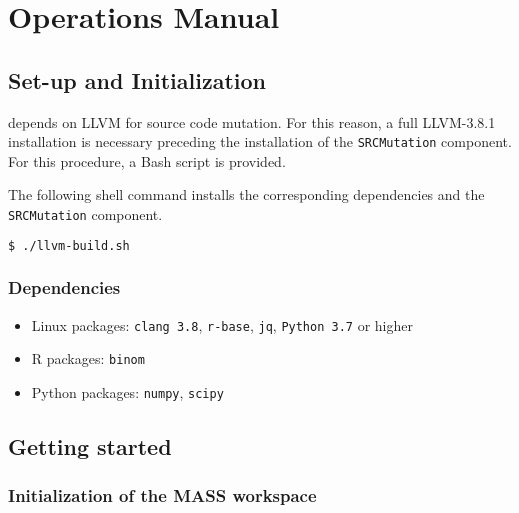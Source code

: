 
\chapter{Operations Manual}

\section{Set-up and Initialization}
\label{sec:install}

\MASS depends on LLVM for source code mutation. For this reason, a full LLVM-3.8.1 installation is necessary preceding the installation of the \texttt{SRCMutation} component. For this procedure, a Bash script is provided.

The following shell command installs the corresponding dependencies and the \texttt{SRCMutation} component.

\begin{lstlisting}[language=bash]
  $ ./llvm-build.sh
\end{lstlisting}

\subsection{Dependencies}


\begin{itemize}
	\item Linux packages: \texttt{clang 3.8}, \texttt{r-base}, \texttt{jq}, \texttt{Python 3.7} or higher
	\item R packages: \texttt{binom}
	\item Python packages: \texttt{numpy}, \texttt{scipy}
\end{itemize}


\section{Getting started}

\subsection{Initialization of the MASS workspace}


